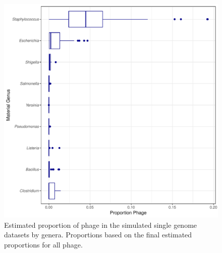 \documentclass[fleqn,10pt,lineno]{wlpeerj}\usepackage[]{graphicx}\usepackage[]{color}
\makeatletter
\def\maxwidth{ %
  \ifdim\Gin@nat@width>\linewidth
    \linewidth
  \else
    \Gin@nat@width
  \fi
}
\newenvironment{knitrout}{}{} %
\makeatother
\begin{document}




\begin{knitrout}
\color{fgcolor}\begin{figure}
\includegraphics[width=\maxwidth]{figure/phage_prop-1} \caption[Estimated proportion of phage in the simulated single genome datasets by genera]{Estimated proportion of phage in the simulated single genome datasets by genera.  Proportions based on the final estimated proportions for all phage.}\label{fig:phage_prop}
\end{figure}


\end{knitrout}
\end{document}
